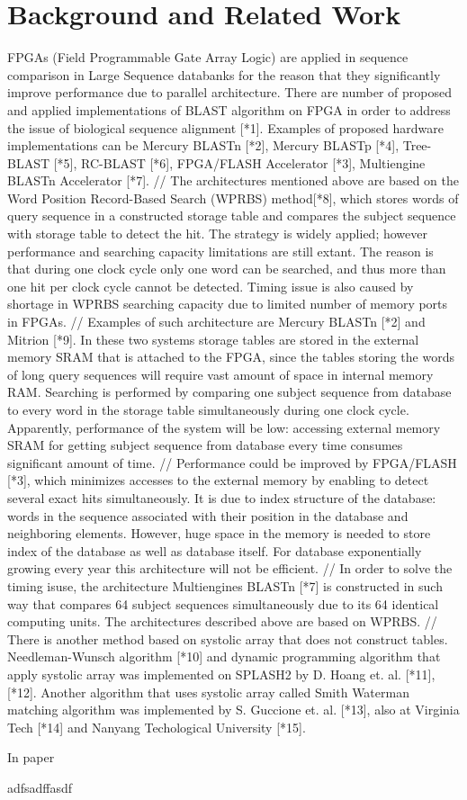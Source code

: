 \section{Background and Related Work}
\label{sec:background}

FPGAs (Field Programmable Gate Array Logic) are applied in sequence comparison in Large Sequence databanks for the reason that they significantly improve performance due to parallel architecture. There are number of proposed and applied implementations of BLAST algorithm on FPGA in order to address the issue of biological sequence alignment [*1]. Examples of proposed hardware implementations can be Mercury BLASTn [*2], Mercury BLASTp [*4], Tree-BLAST [*5], RC-BLAST [*6], FPGA/FLASH Accelerator [*3], Multiengine BLASTn Accelerator  [*7]. 
//
The architectures mentioned above are based on the Word Position Record-Based Search (WPRBS) method[*8], which stores words of query sequence in a constructed storage table and compares the subject sequence with storage table to detect the hit. The strategy is widely applied; however performance and searching capacity limitations are still extant. The reason is that during one clock cycle only one word can be searched, and thus more than one hit per clock cycle cannot be detected. Timing issue is also caused by shortage in WPRBS searching capacity due to limited number of memory ports in FPGAs.
//
Examples of such architecture are Mercury BLASTn [*2] and Mitrion [*9]. In these two systems storage tables are stored in the external memory SRAM that is attached to the FPGA, since the tables storing the words of long query sequences will require vast amount of space in internal memory RAM. Searching is performed by comparing one subject sequence from database to every word in the storage table simultaneously during one clock cycle. Apparently, performance of the system will be low: accessing external memory SRAM for getting subject sequence from database every time consumes significant amount of time.    
//     
Performance could be improved by FPGA/FLASH [*3], which minimizes accesses to the external memory by enabling to detect several exact hits simultaneously. It is due to index structure of the database: words in the sequence associated with their position in the database and neighboring elements. However, huge space in the memory is needed to store index of the database as well as database itself. For database exponentially growing every year this architecture will not be efficient. 
//
In order to solve the timing isuse, the architecture Multiengines BLASTn [*7] is constructed in such way that compares 64 subject sequences simultaneously due to its 64 identical computing units. The architectures described above are based on WPRBS.
//
There is another method based on systolic array that does not construct tables. Needleman-Wunsch algorithm [*10] and dynamic programming algorithm that apply systolic array was implemented on SPLASH2 by D. Hoang et. al. [*11], [*12]. Another algorithm that uses systolic array called Smith Waterman matching algorithm was implemented by S. Guccione et. al. [*13], also at Virginia Tech [*14] and Nanyang Techological University [*15]. 




In paper \cite{vipin2019}

adfsadffasdf
